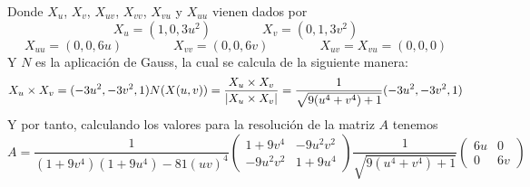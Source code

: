 \documentclass[fleqn]{article}
\begin{document}
    Donde $X_u$, $X_v$, $X_{uv}$, $X_{vv}$, $X_{vu}$ y $X_{uu}$ vienen dados por
    $$
        X_u = (1, 0, 3u^2) \quad \quad \quad \quad
        X_v = (0, 1, 3v^2)
    $$
    $$
        X_{uu} = (0, 0, 6u)\quad \quad \quad \quad
        X_{vv} = (0, 0, 6v)\quad \quad \quad \quad
        X_{uv} = X_{vu} = (0, 0, 0)
    $$
    Y $N$ es la aplicación de Gauss, la cual se calcula de la siguiente manera:
    \begin{equation*}
        X_u \times X_v = (-3u^2, - 3v^2, 1) \\
        N(X(u,v)) = \frac{X_u \times X_v}{|X_u \times X_v|} = \frac{1}{\sqrt{9(u^4 + v^4) + 1}}(-3u^2, - 3v^2, 1)
    \end{equation*}
    Y por tanto, calculando los valores para la resolución de la matriz $A$ tenemos
    $$
    A = \frac{1}{(1 + 9v^4)(1 + 9u^4) - 81(uv)^4}
    \begin{pmatrix}
        1+9v^4 & -9u^2v^2 \\
        -9u^2v^2 & 1+9u^4
    \end{pmatrix}
    \frac{1}{\sqrt{9(u^4 + v^4) + 1}}
    \begin{pmatrix}
        6u & 0 \\
        0 & 6v
    \end{pmatrix}
    $$
\end{document}
